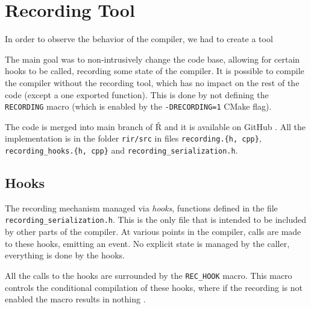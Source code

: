 \chapter{Recording Tool}

\begin{chapterabstract}
	\todoadd
\end{chapterabstract}

In order to observe the behavior of the compiler, we had to create a tool

The main goal was to non-intrusively change the code base, allowing for certain hooks to be called, recording some state of the compiler. It is possible to compile the compiler without the recording tool, which has no impact on the rest of the code (except a one exported function). This is done by not defining the \texttt{RECORDING} macro (which is enabled by the \texttt{-DRECORDING=1} CMake flag).

The code is merged into main branch of Ř and it is available on GitHub \todoadd. All the implementation is in the folder \texttt{rir/src} in files \texttt{recording.\{h, cpp\}}, \texttt{recording\_hooks.\{h, cpp\}} and \texttt{recording\_serialization.h}.


\section{Hooks}

The recording mechanism managed via \textit{hooks}, functions defined in the file \texttt{recording\_serialization.h}. This is the only file that is intended to be included by other parts of the compiler. At various points in the compiler, calls are made to these hooks, emitting an event. No explicit state is managed by the caller, everything is done by the hooks.

All  the calls to the hooks are surrounded by the \texttt{REC\_HOOK} macro. This macro controls the conditional compilation of these hooks, where if the recording is not enabled the macro results in nothing .

